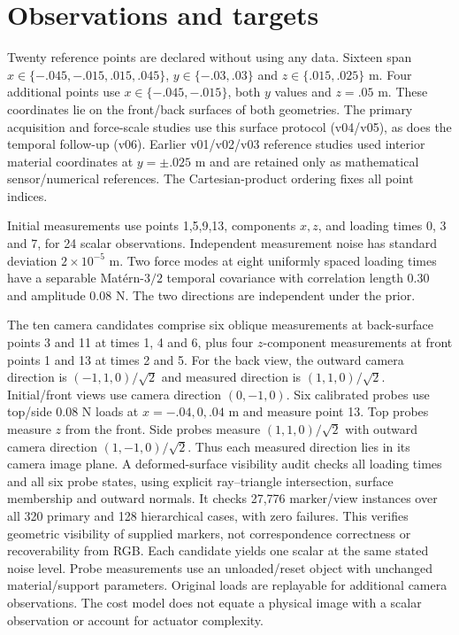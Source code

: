 \documentclass[10pt,twocolumn,letterpaper]{article}
\begin{document}
\section{Observations and targets}
Twenty reference points are declared without using any data. Sixteen span $x\in\{-.045,-.015,.015,.045\}$, $y\in\{-.03,.03\}$ and $z\in\{.015,.025\}$ m. Four additional points use $x\in\{-.045,-.015\}$, both $y$ values and $z=.05$ m. These coordinates lie on the front/back surfaces of both geometries. The primary acquisition and force-scale studies use this surface protocol (v04/v05), as does the temporal follow-up (v06). Earlier v01/v02/v03 reference studies used interior material coordinates at $y=\pm.025$ m and are retained only as mathematical sensor/numerical references. The Cartesian-product ordering fixes all point indices.

Initial measurements use points 1,5,9,13, components $x,z$, and loading times 0, 3 and 7, for 24 scalar observations. Independent measurement noise has standard deviation $2\times 10^{-5}$ m. Two force modes at eight uniformly spaced loading times have a separable Mat\'ern-$3/2$ temporal covariance with correlation length 0.30 and amplitude 0.08 N. The two directions are independent under the prior.

The ten camera candidates comprise six oblique measurements at back-surface points 3 and 11 at times 1, 4 and 6, plus four $z$-component measurements at front points 1 and 13 at times 2 and 5. For the back view, the outward camera direction is $(-1,1,0)/\sqrt2$ and measured direction is $(1,1,0)/\sqrt2$. Initial/front views use camera direction $(0,-1,0)$. Six calibrated probes use top/side 0.08 N loads at $x=-.04,0,.04$ m and measure point 13. Top probes measure $z$ from the front. Side probes measure $(1,1,0)/\sqrt2$ with outward camera direction $(1,-1,0)/\sqrt2$. Thus each measured direction lies in its camera image plane. A deformed-surface visibility audit checks all loading times and all six probe states, using explicit ray--triangle intersection, surface membership and outward normals. It checks 27,776 marker/view instances over all 320 primary and 128 hierarchical cases, with zero failures. This verifies geometric visibility of supplied markers, not correspondence correctness or recoverability from RGB. Each candidate yields one scalar at the same stated noise level. Probe measurements use an unloaded/reset object with unchanged material/support parameters. Original loads are replayable for additional camera observations. The cost model does not equate a physical image with a scalar observation or account for actuator complexity.
\end{document}
